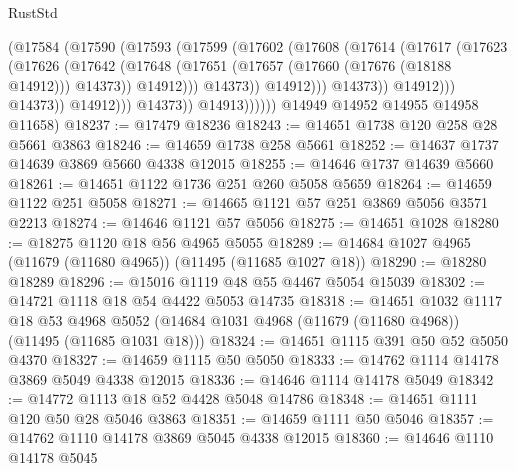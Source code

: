 \begin{lexlean}{RustStd}
\begin{coremodule}
                                  (@17584
                                    (@17590
                                      (@17593
                                        (@17599
                                          (@17602
                                            (@17608
                                              (@17614
                                                (@17617
                                                  (@17623
                                                    (@17626
                                                      (@17642
                                                        (@17648
                                                          (@17651
                                                            (@17657
                                                              (@17660 (@17676 (@18188 @14912)))
                                                              @14373))
                                                          @14912)))
                                                    @14373))
                                                @14912)))
                                          @14373))
                                      @14912)))
                                @14373))
                            @14912)))
                      @14373))
                  @14913))))))
      @14949
      @14952
      @14955
      @14958
      @11658)
@18237 := @17479 @18236
@18243 := @14651 @1738 @120 @258 @28 @5661 @3863
@18246 := @14659 @1738 @258 @5661
@18252 := @14637 @1737 @14639 @3869 @5660 @4338 @12015
@18255 := @14646 @1737 @14639 @5660
@18261 := @14651 @1122 @1736 @251 @260 @5058 @5659
@18264 := @14659 @1122 @251 @5058
@18271 := @14665 @1121 @57 @251 @3869 @5056 @3571 @2213
@18274 := @14646 @1121 @57 @5056
@18275 := @14651 @1028
@18280 := @18275 @1120 @18 @56 @4965 @5055
@18289 := @14684 @1027 @4965 (@11679 (@11680 @4965)) (@11495 (@11685 @1027 @18))
@18290 := @18280 @18289
@18296 := @15016 @1119 @48 @55 @4467 @5054 @15039
@18302 := @14721 @1118 @18 @54 @4422 @5053 @14735
@18318 := @14651
    @1032
    @1117
    @18
    @53
    @4968
    @5052
    (@14684 @1031 @4968 (@11679 (@11680 @4968)) (@11495 (@11685 @1031 @18)))
@18324 := @14651 @1115 @391 @50 @52 @5050 @4370
@18327 := @14659 @1115 @50 @5050
@18333 := @14762 @1114 @14178 @3869 @5049 @4338 @12015
@18336 := @14646 @1114 @14178 @5049
@18342 := @14772 @1113 @18 @52 @4428 @5048 @14786
@18348 := @14651 @1111 @120 @50 @28 @5046 @3863
@18351 := @14659 @1111 @50 @5046
@18357 := @14762 @1110 @14178 @3869 @5045 @4338 @12015
@18360 := @14646 @1110 @14178 @5045

\end{coremodule}
\end{lexlean}
